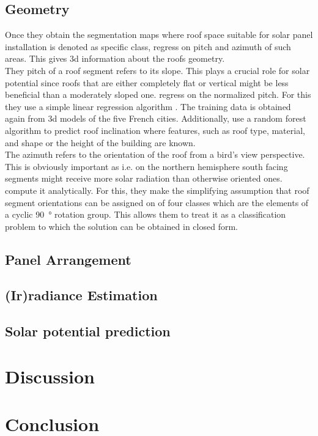 \documentclass{article} %
\begin{document}
\subsection*{Geometry}
Once they obtain the segmentation maps where roof space suitable for solar panel installation is denoted as specific class, \citet{de2021predicting} regress on pitch and azimuth of such areas. This gives 3d information about the roofs geometry.\\
They pitch of a roof segment refers to its slope. This plays a crucial role for solar potential since roofs that are either completely flat or vertical might be less beneficial than a moderately sloped one. \citet{de2021predicting} regress on the normalized pitch. For this they use a simple linear regression algorithm \cite{gross2003linear}. The training data is obtained again from 3d models of the five French cities. Additionally,\citet{de2021predicting} use a random forest algorithm \cite{belgiu2016random} to predict roof inclination where features, such as roof type, material, and shape or the height of the building are known.\\
The azimuth refers to the orientation of the roof from a bird's view perspective. This is obviously important as i.e. on the northern hemisphere south facing segments might receive more solar radiation than otherwise oriented ones.\\ \citet{de2021predicting} compute it analytically. For this, they make the simplifying assumption that roof segment orientations can be assigned on of four classes which are the elements of a cyclic \SI{90}{\degree} rotation group. This allows them to treat it as a classification problem to which the solution can be obtained in closed form.

\subsection*{Panel Arrangement}
\subsection*{(Ir)radiance Estimation}
\subsection*{Solar potential prediction}




\section*{Discussion}


\section*{Conclusion}


\newpage



\end{document}
